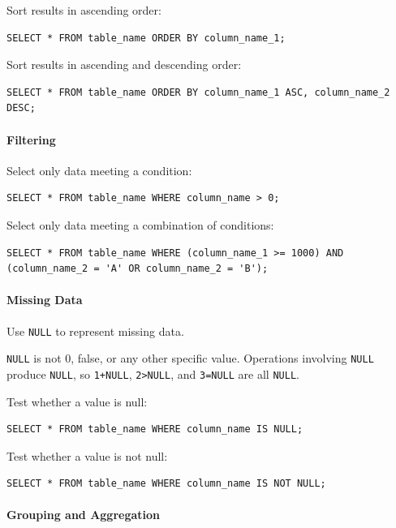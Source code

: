 \documentclass{book}
\begin{document}
Sort results in ascending order:

\begin{verbatim}
SELECT * FROM table_name ORDER BY column_name_1;
\end{verbatim}

Sort results in ascending and descending order:

\begin{verbatim}
SELECT * FROM table_name ORDER BY column_name_1 ASC, column_name_2 DESC;
\end{verbatim}

\mbox{}\paragraph{Filtering}

Select only data meeting a condition:

\begin{verbatim}
SELECT * FROM table_name WHERE column_name > 0;
\end{verbatim}

Select only data meeting a combination of conditions:

\begin{verbatim}
SELECT * FROM table_name WHERE (column_name_1 >= 1000) AND (column_name_2 = 'A' OR column_name_2 = 'B');
\end{verbatim}

\mbox{}\paragraph{Missing Data}

Use \texttt{NULL} to represent missing data.

\texttt{NULL} is not 0, false, or any other specific value. Operations
involving \texttt{NULL} produce \texttt{NULL}, so \texttt{1+NULL},
\texttt{2\textgreater{}NULL}, and \texttt{3=NULL} are all \texttt{NULL}.

Test whether a value is null:

\begin{verbatim}
SELECT * FROM table_name WHERE column_name IS NULL;
\end{verbatim}

Test whether a value is not null:

\begin{verbatim}
SELECT * FROM table_name WHERE column_name IS NOT NULL;
\end{verbatim}

\mbox{}\paragraph{Grouping and Aggregation}
\end{document}
